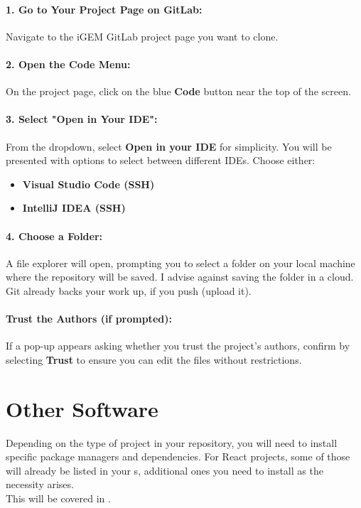 \paragraph{1. Go to Your Project Page on GitLab:}
Navigate to the iGEM GitLab project page you want to clone.  
\paragraph{2. Open the Code Menu:}
On the project page, click on the blue \textbf{Code} button near the top of the screen.
\paragraph{3. Select "Open in Your IDE":}
From the dropdown, select \textbf{Open in your IDE} for simplicity.
You will be presented with options to select between different IDEs. Choose either:
\begin{itemize}
    \item \textbf{Visual Studio Code (SSH)}
    \item \textbf{IntelliJ IDEA (SSH)}
\end{itemize}
\paragraph{4. Choose a Folder:}
A file explorer will open, prompting you to select a folder on your local machine where the repository will be saved.
I advise against saving the folder in a cloud.
Git already backs your work up, if you push (upload it).
\paragraph{Trust the Authors (if prompted):}
If a pop-up appears asking whether you trust the project’s authors, confirm by selecting \textbf{Trust} to ensure you can edit the files without restrictions.

\section{Other Software} \label{sec:other-software}
Depending on the type of project in your repository, you will need to install specific package managers and dependencies.
For React projects, some of those will already be listed in your s, additional ones you
need to install as the necessity arises. \\
This will be covered in .


